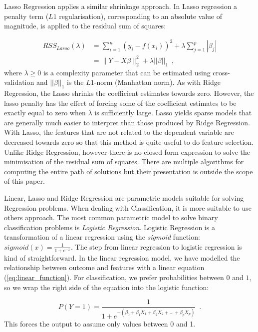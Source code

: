 Lasso Regression applies a similar shrinkage approach. In Lasso regression a penalty term ($L1$ regularisation), corresponding to an absolute value of magnitude, is applied to the residual sum of squares:

\begin{equation}
\begin{aligned}
 RSS_{Lasso}(\lambda) & = \sum_{i=1}^{n}(y_i -f(x_i))^2 + \lambda\sum_{j=1}^{p}|\beta_{j}| \\
& = \|Y - X\beta\|_2^2 + \lambda||\beta||_1
    \enspace,
\end{aligned}
\end{equation}
where $\lambda \geq 0 $ is a complexity parameter that can be estimated using cross-validation and $||\beta||_1$ is the $L1$-norm (Manhattan norm). As with Ridge Regression, the Lasso shrinks the coefficient estimates towards zero. However, the lasso penalty has the effect of forcing some of the coefficient estimates to be exactly equal to zero when $\lambda$ is sufficiently large. Lasso yields sparse models that are generally much easier to interpret than those produced by Ridge Regression. With Lasso, the features that are not related to the dependent variable are decreased towards zero so that this method is quite useful to do feature selection. Unlike Ridge Regression, however there is no closed form expression to solve the minimisation of the residual sum of squares. There are multiple algorithms for computing the entire path of solutions but their presentation is outside the scope of this paper. 

Linear, Lasso and Ridge Regression are parametric models suitable for solving Regression problems. When dealing with Classification, it is more suitable to use others approach. The most common parametric model to solve binary classification problems is \textit{Logistic Regression}. Logistic Regression is a transformation of a linear regression using the \textit{sigmoid} function: $sigmoid(x) = \frac{1}{1 + e^{-x}}$. The step from linear regression to logistic regression is kind of straightforward. In the linear regression model, we have modelled the relationship between outcome and features with a linear equation (\ref{eq:linear_function}). For classification, we prefer probabilities between $0$ and $1$, so we wrap the right side of the equation into the logistic function:

\begin{equation}
    P(Y=1) = \frac{1}{1 + e^{- (\beta_0 + \beta_1X_1 + \beta_2X_2 + \ldots + \beta_pX_p)} }
    \enspace.
\end{equation}
This forces the output to assume only values between 0 and 1.

